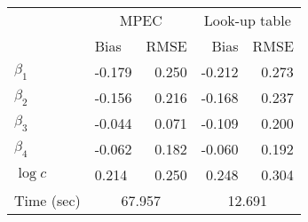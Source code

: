 

\begin{tabular}[t]{llrrr}
\toprule
 & \multicolumn{2}{c}{MPEC} & \multicolumn{2}{c}{Look-up table}\\
  & Bias & RMSE & Bias & RMSE\\
\midrule
$\beta_{1}$ & -0.179 & 0.250 & -0.212 & 0.273\\
$\beta_{2}$ & -0.156 & 0.216 & -0.168 & 0.237\\
$\beta_{3}$ & -0.044 & 0.071 & -0.109 & 0.200\\
$\beta_{4}$ & -0.062 & 0.182 & -0.060 & 0.192\\
$\log c$ & 0.214 & 0.250 & 0.248 & 0.304\\
Time (sec) &  \multicolumn{2}{c}{67.957} & \multicolumn{2}{c}{ 12.691}\\
\bottomrule
\end{tabular}
